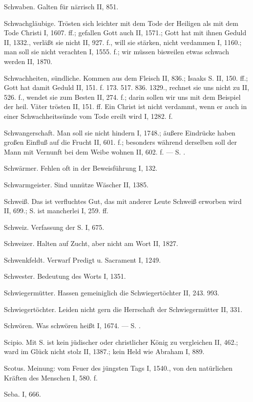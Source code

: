 Schwaben. Galten für närrisch II, 851.

Schwachgläubige. Trösten sich leichter mit dem Tode der Heiligen als mit dem Tode Christi I, 1607. ff.; gefallen Gott auch II, 1571.; Gott hat mit ihnen Geduld II, 1332., verläßt sie nicht II, 927. f., will sie stärken, nicht verdammen I, 1160.; man soll sie nicht verachten I, 1555. f.; wir müssen bisweilen etwas schwach werden II, 1870.

Schwachheiten, sündliche. Kommen aus dem Fleisch II, 836.; Isaaks S. II, 150. ff.; Gott hat damit Geduld II, 151. f. 173. 517. 836. 1329., rechnet sie uns nicht zu II, 526. f., wendet sie zum Besten II, 274. f.; darin sollen wir uns mit dem Beispiel der heil. Väter trösten II, 151. ff. Ein Christ ist nicht verdammt, wenn er auch in einer Schwachheitssünde vom Tode ereilt wird I, 1282. f.

Schwangerschaft. Man soll sie nicht hindern I, 1748.; äußere Eindrücke haben großen Einfluß auf die Frucht II, 601. f.; besonders während derselben soll der Mann mit Vernunft bei dem Weibe wohnen II, 602. f. — S. .

Schwärmer. Fehlen oft in der Beweisführung I, 132.

Schwarmgeister. Sind unnütze Wäscher II, 1385.

Schweiß. Das ist verfluchtes Gut, das mit anderer Leute Schweiß erworben wird II, 699.; S.  ist mancherlei I, 259. ff.

Schweiz. Verfassung der S. I, 675.

Schweizer. Halten auf Zucht, aber nicht am Wort II, 1827.

Schwenkfeldt. Verwarf Predigt u. Sacrament I, 1249.

Schwester. Bedeutung des Worts I, 1351.

Schwiegermütter. Hassen gemeiniglich die Schwiegertöchter II, 243. 993.

Schwiegertöchter. Leiden nicht gern die Herrschaft der Schwiegermütter II, 331.

Schwören. Was schwören heißt I, 1674. — S. .

Scipio. Mit S. ist kein jüdischer oder christlicher König zu vergleichen II, 462.; ward im Glück nicht stolz II, 1387.; kein Held wie Abraham I, 889.

Scotus. Meinung: vom Feuer des jüngsten Tags I, 1540., von den natürlichen Kräften des Menschen I, 580. f.

Seba. I, 666.

